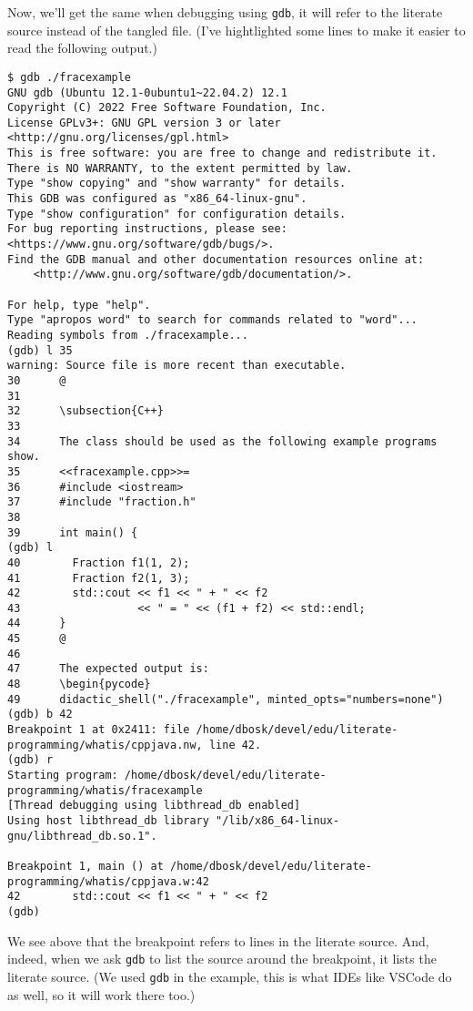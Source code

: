 Now, we'll get the same when debugging using \texttt{gdb}, it will refer to the 
literate source instead of the tangled file.
(I've hightlighted some lines to make it easier to read the following output.)
\begin{verbatim}
$ gdb ./fracexample
GNU gdb (Ubuntu 12.1-0ubuntu1~22.04.2) 12.1
Copyright (C) 2022 Free Software Foundation, Inc.
License GPLv3+: GNU GPL version 3 or later <http://gnu.org/licenses/gpl.html>
This is free software: you are free to change and redistribute it.
There is NO WARRANTY, to the extent permitted by law.
Type "show copying" and "show warranty" for details.
This GDB was configured as "x86_64-linux-gnu".
Type "show configuration" for configuration details.
For bug reporting instructions, please see:
<https://www.gnu.org/software/gdb/bugs/>.
Find the GDB manual and other documentation resources online at:
    <http://www.gnu.org/software/gdb/documentation/>.

For help, type "help".
Type "apropos word" to search for commands related to "word"...
Reading symbols from ./fracexample...
(gdb) l 35
warning: Source file is more recent than executable.
30      @
31
32      \subsection{C++}
33
34      The class should be used as the following example programs show.
35      <<fracexample.cpp>>=
36      #include <iostream>
37      #include "fraction.h"
38
39      int main() {
(gdb) l
40        Fraction f1(1, 2);
41        Fraction f2(1, 3);
42        std::cout << f1 << " + " << f2
43                  << " = " << (f1 + f2) << std::endl;
44      }
45      @
46
47      The expected output is:
48      \begin{pycode}
49      didactic_shell("./fracexample", minted_opts="numbers=none")
(gdb) b 42
Breakpoint 1 at 0x2411: file /home/dbosk/devel/edu/literate-programming/whatis/cppjava.nw, line 42.
(gdb) r
Starting program: /home/dbosk/devel/edu/literate-programming/whatis/fracexample 
[Thread debugging using libthread_db enabled]
Using host libthread_db library "/lib/x86_64-linux-gnu/libthread_db.so.1".

Breakpoint 1, main () at /home/dbosk/devel/edu/literate-programming/whatis/cppjava.w:42
42        std::cout << f1 << " + " << f2
(gdb) 
\end{verbatim}
We see above that the breakpoint refers to lines in the literate source.
And, indeed, when we ask \texttt{gdb} to list the source around the breakpoint, 
it lists the literate source.
(We used \texttt{gdb} in the example, this is what IDEs like VSCode do as well, 
so it will work there too.)
